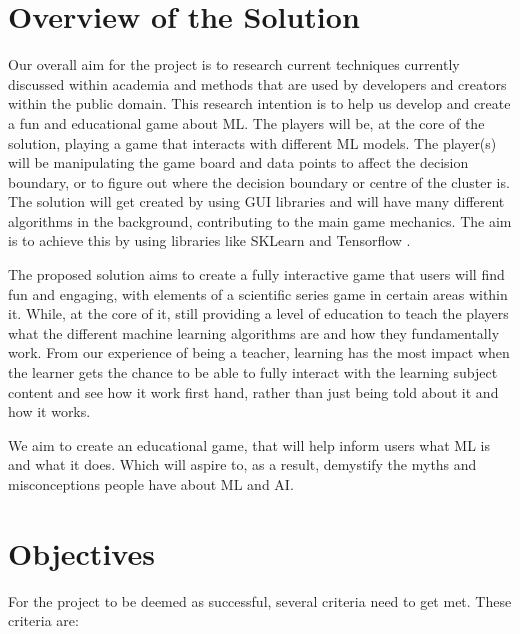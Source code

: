 	\section{Overview of the Solution}
		\label{sec:overview_of_solution}
		Our overall aim for the project is to research current techniques currently discussed within academia and methods that are used by developers and creators within the public domain. This research intention is to help us develop and create a fun and educational game about ML. The players will be, at the core of the solution, playing a game that interacts with different ML models. The player(s) will be manipulating the game board and data points to affect the decision boundary, or to figure out where the decision boundary or centre of the cluster is. The solution will get created by using  GUI libraries and will have many different algorithms in the background, contributing to the main game mechanics. The aim is to achieve this by using libraries like SKLearn \cite{sklearn_api} and Tensorflow \cite{tensorflow2015-whitepaper}.
		
		The proposed solution aims to create a fully interactive game that users will find fun and engaging, with elements of a scientific series game in certain areas within it. While, at the core of it, still providing a level of education to teach the players what the different machine learning algorithms are and how they fundamentally work. From our experience of being a teacher, learning has the most impact when the learner gets the chance to be able to fully interact with the learning subject content and see how it work first hand, rather than just being told about it and how it works. 
		
		We aim to create an educational game, that will help inform users what ML is and what it does. Which will aspire to, as a result, demystify the myths and misconceptions people have about ML and AI.
		
	
	\section{Objectives}
	
	For the project to be deemed as successful, several criteria need to get met. These criteria are:
	
